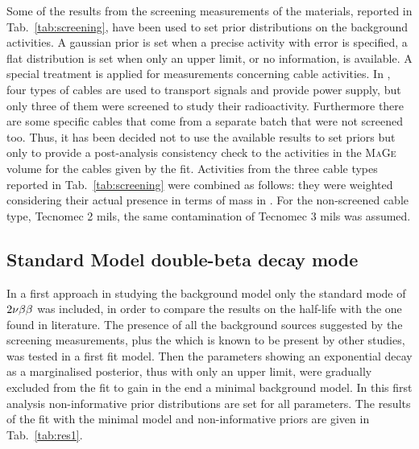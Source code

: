 Some of the results from the screening measurements of the materials, reported in Tab.~\ref{tab:screening}, have been used to set prior distributions on the background activities. A gaussian prior is set when a precise activity with error is specified, a flat distribution is set when only an upper limit, or no information, is available. A special treatment is applied for measurements concerning cable activities. In {\gerda}, four types of cables are used to transport signals and provide power supply, but only three of them were screened to study their radioactivity. Furthermore there are some specific cables that come from a separate batch that were not screened too. Thus, it has been decided not to use the available results to set priors but only to provide a post-analysis consistency check to the activities in the \textsc{MaGe} volume for the cables given by the fit. Activities from the three cable types reported in Tab.~\ref{tab:screening} were combined as follows: they were weighted considering their actual presence in terms of mass in {\gerda}. For the non-screened cable type, Tecnomec 2 mils, the same contamination of Tecnomec 3 mils was assumed.

\subsection*{Standard Model double-beta decay mode}
In a first approach in studying the background model only the standard mode of $2\nu\beta\beta$ was included, in order to compare the results on the half-life with the one found in literature. The presence of all the background sources suggested by the screening measurements, plus the  which is known to be present by other studies, was tested in a first fit model. Then the parameters showing an exponential decay as a marginalised posterior, thus with only an upper limit, were gradually excluded from the fit to gain in the end a minimal background model. In this first analysis non-informative prior distributions are set for all parameters. The results of the fit with the minimal model and non-informative priors are given in Tab.~\ref{tab:res1}.

